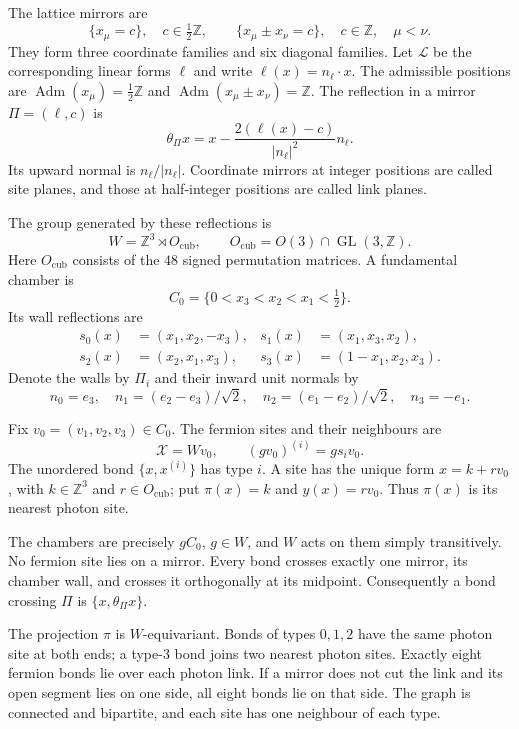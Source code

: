 \documentclass[11pt,letterpaper,reqno]{amsart}
\newcommand{\Z}{\mathbb Z}
\begin{document}
The lattice mirrors are
\begin{equation}\label{eq:reg-mirrors}
 \{x_\mu=c\},\quad c\in\tfrac12\Z,
 \qquad
 \{x_\mu\pm x_\nu=c\},\quad c\in\Z,\quad\mu<\nu.
\end{equation}
They form three coordinate families and six diagonal families. Let
$\mathcal L$ be the corresponding linear forms $\ell$ and write
$\ell(x)=n_\ell\cdot x$. The admissible positions are
$\operatorname{Adm}(x_\mu)=\frac12\Z$ and
$\operatorname{Adm}(x_\mu\pm x_\nu)=\Z$. The reflection in a mirror
$\Pi=(\ell,c)$ is
\begin{equation}\label{eq:reg-reflection}
 \theta_\Pi x=x-\frac{2(\ell(x)-c)}{|n_\ell|^2}n_\ell.
\end{equation}
Its upward normal is $n_\ell/|n_\ell|$. Coordinate mirrors at integer
positions are called site planes, and those at half-integer positions
are called link planes.

The group generated by these reflections is
\[
 W=\Z^3\rtimes O_{\mathrm{cub}},
 \qquad O_{\mathrm{cub}}=O(3)\cap\operatorname{GL}(3,\Z).
\]
Here $O_{\mathrm{cub}}$ consists of the $48$ signed permutation matrices.
A fundamental chamber is
\[
 C_0=\{0<x_3<x_2<x_1<\tfrac12\}.
\]
Its wall reflections are
\begin{align*}
 s_0(x)&=(x_1,x_2,-x_3),&
 s_1(x)&=(x_1,x_3,x_2),\\
 s_2(x)&=(x_2,x_1,x_3),&
 s_3(x)&=(1-x_1,x_2,x_3).
\end{align*}
Denote the walls by $\Pi_i$ and their inward unit normals by
\begin{equation}\label{eq:reg-wall-normals}
 n_0=e_3,\quad n_1=(e_2-e_3)/\sqrt2,
 \quad n_2=(e_1-e_2)/\sqrt2,\quad n_3=-e_1.
\end{equation}

Fix $v_0=(v_1,v_2,v_3)\in C_0$. The fermion sites and their neighbours
are
\begin{equation}\label{eq:reg-fermion-sites}
 \mathcal X=Wv_0,\qquad (gv_0)^{(i)}=gs_iv_0.
\end{equation}
The unordered bond $\{x,x^{(i)}\}$ has type $i$. A site has the unique
form $x=k+rv_0$, with $k\in\Z^3$ and $r\in O_{\mathrm{cub}}$; put
$\pi(x)=k$ and $y(x)=rv_0$. Thus $\pi(x)$ is its nearest photon site.

\begin{proposition}\label{prop:reg-geometry}
The chambers are precisely $gC_0$, $g\in W$, and $W$ acts on them
simply transitively. No fermion site lies on a mirror. Every bond
crosses exactly one mirror, its chamber wall, and crosses it
orthogonally at its midpoint. Consequently a bond crossing $\Pi$ is
$\{x,\theta_\Pi x\}$.

The projection $\pi$ is $W$-equivariant. Bonds of types $0,1,2$ have
the same photon site at both ends; a type-$3$ bond joins two nearest
photon sites. Exactly eight fermion bonds lie over each photon link.
If a mirror does not cut the link and its open segment lies on one
side, all eight bonds lie on that side.
The graph is connected and bipartite, and each site has one neighbour
of each type.
\end{proposition}
\end{document}
